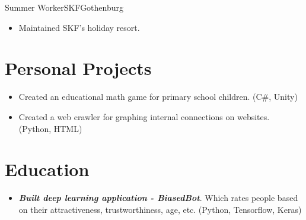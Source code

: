 \documentclass[11pt,a4paper,sans,colorlinks,linkcolor=blue,urlcolor=blue]{moderncv}
\begin{document}
{Summer Worker}{SKF}{Gothenburg}{}
{\begin{itemize}
    \itemsep0.3em
    \setlength{\itemindent}{.25in}
    \item Maintained SKF's holiday resort.
\end{itemize}}


\section{Personal Projects}
{\begin{itemize}
    \itemsep0.3em
    \setlength{\itemindent}{.25in}
    \item Created an educational math game for primary school children. (C\#, Unity)
\end{itemize}}

{\begin{itemize}
    \itemsep0.3em
    \setlength{\itemindent}{.25in}
    \item Created a web crawler for graphing internal connections on websites. (Python, HTML)
\end{itemize}}


\section{Education}
{}

{\begin{itemize}
    \setlength{\itemindent}{.25in}
    \itemsep0.3em
    \item \textit{\textbf{Built deep learning application - BiasedBot}}. Which rates people based on their attractiveness, trustworthiness, age, etc. (Python, Tensorflow, Keras)
\end{itemize}}
\end{document}
